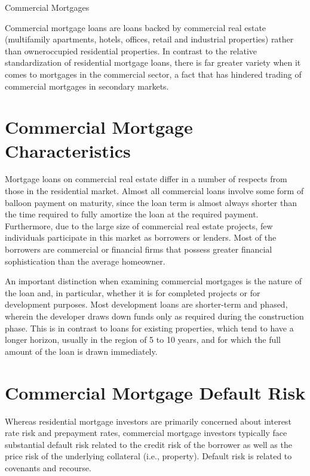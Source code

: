 \documentclass[11pt]{article}
\begin{document}
Commercial Mortgages

Commercial mortgage loans are loans backed by commercial real estate (multifamily apartments, hotels, offices, retail and industrial properties) rather than owneroccupied residential properties. In contrast to the relative standardization of residential mortgage loans, there is far greater variety when it comes to mortgages in the commercial sector, a fact that has hindered trading of commercial mortgages in secondary markets.

\section*{Commercial Mortgage Characteristics}
Mortgage loans on commercial real estate differ in a number of respects from those in the residential market. Almost all commercial loans involve some form of balloon payment on maturity, since the loan term is almost always shorter than the time required to fully amortize the loan at the required payment. Furthermore, due to the large size of commercial real estate projects, few individuals participate in this market as borrowers or lenders. Most of the borrowers are commercial or financial firms that possess greater financial sophistication than the average homeowner.

An important distinction when examining commercial mortgages is the nature of the loan and, in particular, whether it is for completed projects or for development purposes. Most development loans are shorter-term and phased, wherein the developer draws down funds only as required during the construction phase. This is in contrast to loans for existing properties, which tend to have a longer horizon, usually in the region of 5 to 10 years, and for which the full amount of the loan is drawn immediately.

\section*{Commercial Mortgage Default Risk}
Whereas residential mortgage investors are primarily concerned about interest rate risk and prepayment rates, commercial mortgage investors typically face substantial default risk related to the credit risk of the borrower as well as the price risk of the underlying collateral (i.e., property). Default risk is related to covenants and recourse.
\end{document}
